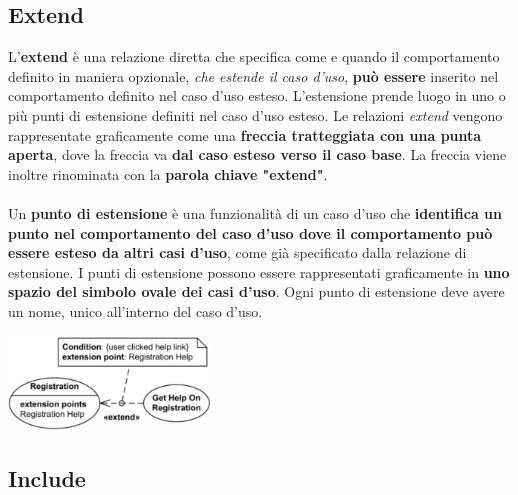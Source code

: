 \documentclass{article}
\begin{document}
\subsection*{Extend}
\large

L'\textbf{extend} è una relazione diretta che specifica come e quando il comportamento definito in maniera opzionale, \textit{che estende il caso d'uso}, \textbf{può essere} inserito nel comportamento definito nel caso d'uso esteso. L'estensione prende luogo in uno o più punti di estensione definiti nel caso d'uso esteso. Le relazioni \textit{extend} vengono rappresentate graficamente come una \textbf{freccia tratteggiata con una punta aperta}, dove la freccia va \textbf{dal caso esteso verso il caso base}. La freccia viene inoltre rinominata con la \textbf{parola chiave "extend"}. \\ \\
Un \textbf{punto di estensione} è una funzionalità di un caso d'uso che \textbf{identifica un punto nel comportamento del caso d'uso dove il comportamento può essere esteso da altri casi d'uso}, come già specificato dalla relazione di estensione.
I punti di estensione possono essere rappresentati graficamente in \textbf{uno spazio del simbolo ovale dei casi d'uso}. Ogni punto di estensione deve avere un nome, unico all'interno del caso d'uso.
\begin{center}
    \includegraphics[width=0.4\textwidth]{foto 5.png}
\end{center}

\subsection*{Include}
\large
\end{document}
